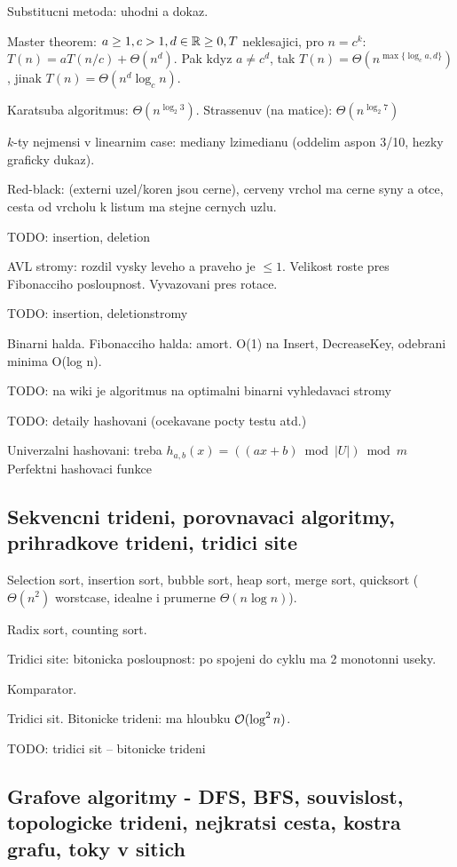 Substitucni metoda: uhodni a dokaz.

Master theorem: $a\geq 1, c>1, d\in\mathbb{R}\geq 0, T$ neklesajici, pro $n=c^k$:
$T(n)=aT(n/c)+\Theta(n^d)$. Pak kdyz $a\neq c^d$, tak
$T(n)=\Theta(n^{\max\{\log_c a, d\}})$, jinak $T(n)=\Theta(n^d \log_c n)$.

Karatsuba algoritmus: $\Theta(n^{\log_2 3})$.
Strassenuv (na matice): $\Theta(n^{\log_2 7})$

$k$-ty nejmensi v linearnim case: mediany lzimedianu (oddelim aspon 3/10,
hezky graficky dukaz).

Red-black: (externi uzel/koren jsou cerne), cerveny vrchol ma cerne
syny a otce, cesta od vrcholu k listum ma stejne cernych uzlu.

TODO: insertion, deletion

AVL stromy: rozdil vysky leveho a praveho je $\leq 1$.
Velikost roste pres Fibonacciho posloupnost.
Vyvazovani pres rotace.

TODO: insertion, deletionstromy

Binarni halda. Fibonacciho halda: amort. O(1) na Insert, DecreaseKey,
odebrani minima O(log n).

TODO: na wiki je algoritmus na optimalni binarni vyhledavaci stromy

TODO: detaily hashovani (ocekavane pocty testu atd.)

Univerzalni hashovani: treba $h_{a,b}(x)=((ax+b)\bmod |U|) \bmod m$
Perfektni hashovaci funkce

\subsection{Sekvencni trideni, porovnavaci algoritmy, prihradkove trideni,
tridici site}
Selection sort, insertion sort, bubble sort, heap sort, merge sort, quicksort
($\Theta(n^2)$ worstcase, idealne i prumerne $\Theta(n\log n)$).

Radix sort, counting sort.

Tridici site: bitonicka posloupnost: po spojeni do cyklu ma 2 monotonni useky.

Komparator.

Tridici sit. Bitonicke trideni: ma hloubku $\mathcal{O}(\log^2 n)$.

TODO: tridici sit -- bitonicke trideni

\subsection{Grafove algoritmy - DFS, BFS, souvislost, topologicke trideni,
nejkratsi cesta, kostra grafu, toky v sitich}

